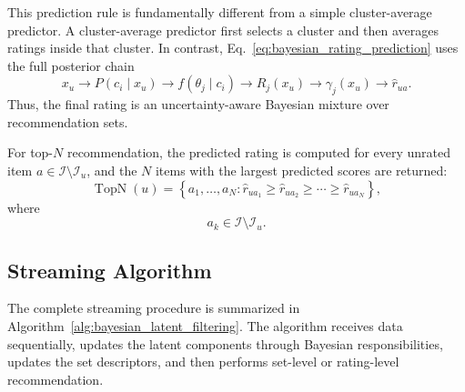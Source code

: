 \documentclass{article}
\theoremstyle{plain}
\theoremstyle{definition}
\theoremstyle{remark}
\begin{document}
This prediction rule is fundamentally different from a simple cluster-average predictor. A cluster-average predictor first selects a cluster and then averages ratings inside that cluster. In contrast, Eq.~\eqref{eq:bayesian_rating_prediction} uses the full posterior chain
\[
x_u
\longrightarrow
P(c_i\mid x_u)
\longrightarrow
f(\theta_j\mid c_i)
\longrightarrow
R_j(x_u)
\longrightarrow
\gamma_j(x_u)
\longrightarrow
\widehat r_{ua}.
\]
Thus, the final rating is an uncertainty-aware Bayesian mixture over recommendation sets.

For top-\(N\) recommendation, the predicted rating is computed for every unrated item \(a\in\mathcal I\setminus\mathcal I_u\), and the \(N\) items with the largest predicted scores are returned:
\begin{equation}
	\label{eq:topn_rule}
	\operatorname{TopN}(u)
	=
	\left\{
	a_1,\ldots,a_N
	:
	\widehat r_{ua_1}
	\geq
	\widehat r_{ua_2}
	\geq
	\cdots
	\geq
	\widehat r_{ua_N}
	\right\},
\end{equation}
where
\[
a_k\in\mathcal I\setminus\mathcal I_u.
\]

\subsection{Streaming Algorithm}
\label{subsec:streaming_algorithm}

The complete streaming procedure is summarized in Algorithm~\ref{alg:bayesian_latent_filtering}. The algorithm receives data sequentially, updates the latent components through Bayesian responsibilities, updates the set descriptors, and then performs set-level or rating-level recommendation.
\end{document}
